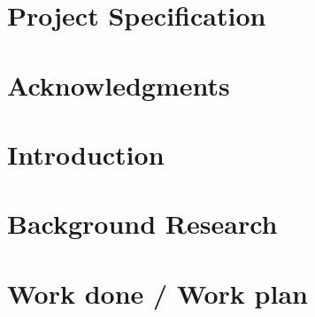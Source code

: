\documentclass[]{UCD_CS_FYP_Report}
\begin{document}
\maketitle


\chapter*{Project Specification}



\begin{abstract}
		
\end{abstract}
\newpage


\chapter*{Acknowledgments}



\tableofcontents{}\newpage
\newpage


\chapter{Introduction}



\chapter{Background Research}



\chapter{Work done / Work plan}


\newpage


\label{endpage}
\end{document}
